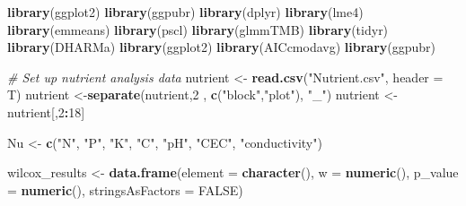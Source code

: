 \documentclass[
]{article}
\newenvironment{Shaded}{\begin{snugshade}}{\end{snugshade}}
\newcommand{\AttributeTok}[1]{\textcolor[rgb]{0.13,0.29,0.53}{#1}}
\newcommand{\CommentTok}[1]{\textcolor[rgb]{0.56,0.35,0.01}{\textit{#1}}}
\newcommand{\ConstantTok}[1]{\textcolor[rgb]{0.56,0.35,0.01}{#1}}
\newcommand{\DecValTok}[1]{\textcolor[rgb]{0.00,0.00,0.81}{#1}}
\newcommand{\FunctionTok}[1]{\textcolor[rgb]{0.13,0.29,0.53}{\textbf{#1}}}
\newcommand{\NormalTok}[1]{#1}
\newcommand{\OtherTok}[1]{\textcolor[rgb]{0.56,0.35,0.01}{#1}}
\newcommand{\SpecialCharTok}[1]{\textcolor[rgb]{0.81,0.36,0.00}{\textbf{#1}}}
\newcommand{\StringTok}[1]{\textcolor[rgb]{0.31,0.60,0.02}{#1}}
\begin{document}
\begin{Shaded}
\begin{Highlighting}[]
\FunctionTok{library}\NormalTok{(ggplot2)}
\FunctionTok{library}\NormalTok{(ggpubr)}
\FunctionTok{library}\NormalTok{(dplyr)}
\FunctionTok{library}\NormalTok{(lme4)}
\FunctionTok{library}\NormalTok{(emmeans)}
\FunctionTok{library}\NormalTok{(pscl)}
\FunctionTok{library}\NormalTok{(glmmTMB)}
\FunctionTok{library}\NormalTok{(tidyr)}
\FunctionTok{library}\NormalTok{(DHARMa)}
\FunctionTok{library}\NormalTok{(ggplot2)}
\FunctionTok{library}\NormalTok{(AICcmodavg)}
\FunctionTok{library}\NormalTok{(ggpubr)}

\CommentTok{\# Set up nutrient analysis data}
\NormalTok{nutrient }\OtherTok{\textless{}{-}} \FunctionTok{read.csv}\NormalTok{(}\StringTok{"Nutrient.csv"}\NormalTok{, }\AttributeTok{header =}\NormalTok{ T)}
\NormalTok{nutrient }\OtherTok{\textless{}{-}}\FunctionTok{separate}\NormalTok{(nutrient,}\DecValTok{2}\NormalTok{ , }\FunctionTok{c}\NormalTok{(}\StringTok{"block"}\NormalTok{,}\StringTok{"plot"}\NormalTok{), }\StringTok{"\_"}\NormalTok{)}
\NormalTok{nutrient }\OtherTok{\textless{}{-}}\NormalTok{ nutrient[,}\DecValTok{2}\SpecialCharTok{:}\DecValTok{18}\NormalTok{]}

\NormalTok{Nu }\OtherTok{\textless{}{-}} \FunctionTok{c}\NormalTok{(}\StringTok{"N"}\NormalTok{, }\StringTok{"P"}\NormalTok{, }\StringTok{"K"}\NormalTok{, }\StringTok{"C"}\NormalTok{, }\StringTok{"pH"}\NormalTok{, }\StringTok{"CEC"}\NormalTok{, }\StringTok{"conductivity"}\NormalTok{)}

\NormalTok{wilcox\_results }\OtherTok{\textless{}{-}} \FunctionTok{data.frame}\NormalTok{(}\AttributeTok{element =} \FunctionTok{character}\NormalTok{(),}
                                \AttributeTok{w =} \FunctionTok{numeric}\NormalTok{(),}
                                \AttributeTok{p\_value =} \FunctionTok{numeric}\NormalTok{(),}
                                \AttributeTok{stringsAsFactors =} \ConstantTok{FALSE}\NormalTok{)}


\end{Highlighting}
\end{Shaded}
\end{document}
